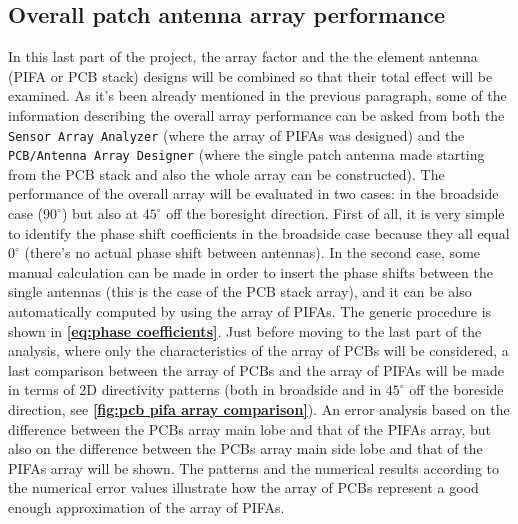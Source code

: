 \documentclass[12pt,a4paper]{article}
\begin{document}
{\begin{multicols}{2}
\section*{\selectfont\color{Turquoise}Overall patch antenna array performance}
In this last part of the project, the array factor and the the element antenna (PIFA or PCB stack) designs will be combined so that their total effect will be examined. As it's been already mentioned in the previous paragraph, some of the information describing the overall array performance can be asked from both the \texttt{\color{Mahogany}Sensor Array Analyzer} (where the array of PIFAs was designed) and the \texttt{\color{Mahogany}PCB/Antenna Array Designer} (where the single patch antenna made starting from the PCB stack and also the whole array can be constructed). The performance of the overall array will be evaluated in two cases: in the broadside case ($90^\circ$) but also at $45^\circ$ off the boresight direction. First of all, it is very simple to identify the phase shift coefficients in the broadside case because they all equal $0^\circ$ (there's no actual phase shift between antennas). In the second case, some manual calculation can be made in order to insert the phase shifts between the single antennas (this is the case of the PCB stack array), and it can be also automatically computed by using the array of PIFAs. The generic procedure is shown in \textbf{\cref{eq:phase coefficients}}. Just before moving to the last part of the analysis, where only the characteristics of the array of PCBs will be considered, a last comparison between the array of PCBs and the array of PIFAs will be made in terms of 2D directivity patterns (both in broadside and in $45^\circ$ off the boreside direction, see \textbf{\cref{fig:pcb pifa array comparison}}). An error analysis based on the difference between the PCBs array main lobe and that of the PIFAs array, but also on the difference between the PCBs array main side lobe and that of the PIFAs array will be shown. The patterns and the numerical results according to the numerical error values illustrate how the array of PCBs represent a good enough approximation of the array of PIFAs. 

\end{multicols}}
\end{document}

